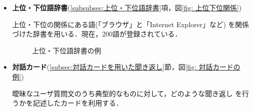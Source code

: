 \begin{itemize}
 \item {\bf 上位・下位語辞書}(\ref{subsubsec:上位・下位語辞書}項，図\ref{fig:
       上位下位関係})

       上位・下位の関係にある語(「ブラウザ」と「Internet Explorer」など) 
       を関係づけた辞書を用いる．現在，200語が登録されている．

\begin{figure}
 \begin{center}
  \caption{上位・下位語辞書の例}
 \label{fig:上位下位関係}
 \end{center}
\end{figure}

 \item {\bf 対話カード}(\ref{subsec:対話カードを用いた聞き返し}節，図\ref{fig:
       対話カードの例})

       曖昧なユーザ質問文のうち典型的なものに対して，どのような聞き返し
       を行うかを記述したカードを利用する．


\end{itemize}
